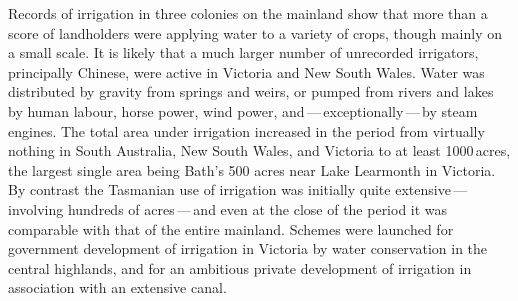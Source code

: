 \closure Records of irrigation in three colonies on the mainland show
that more than a score of landholders were applying water to a variety
of crops, though mainly on a small scale.  It is likely that a much
larger number of unrecorded irrigators, principally Chinese, were
active in Victoria and New South Wales.  Water was distributed by
gravity from springs and weirs, or pumped from rivers and lakes by
human labour, horse power, wind power,
and\,---\,exceptionally\,---\,by steam engines.  The total area under
irrigation increased in the period from virtually nothing in South
Australia, New South Wales, and Victoria to at least 1000\,acres, the
largest single area being Bath's 500 acres near Lake Learmonth in
Victoria.  By contrast the Tasmanian use of irrigation was initially
quite extensive\,---\,involving hundreds of acres\,---\,and even at
the close of the period it was comparable with that of the entire
mainland. Schemes were launched for government development of
irrigation in Victoria by water conservation in the central highlands,
and for an ambitious private development of irrigation in association
with an extensive
canal.

